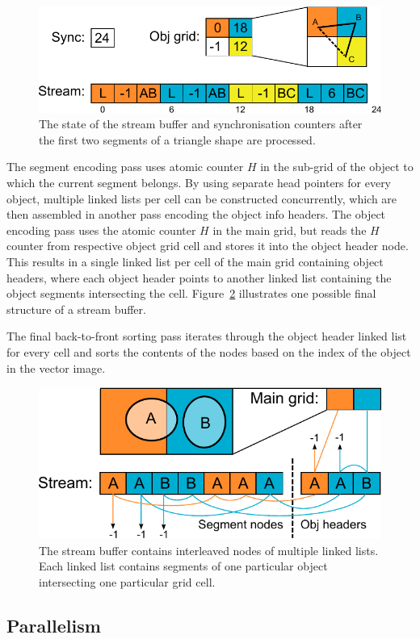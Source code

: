 \documentclass[11pt,a4paper,twoside]{article}
\begin{document}
\begin {figure}
	\centering
	\includegraphics[width=0.6\columnwidth] {figures/cell_stream}
	\caption {The state of the stream buffer and synchronisation counters after the first two segments of a triangle shape are processed.}
	\label {fig:cell_stream}
\end {figure}

The segment encoding pass uses atomic counter $H$ in the sub-grid of the object to which the current segment belongs. By using separate head pointers for every object, multiple linked lists per cell can be constructed concurrently, which are then assembled in another pass encoding the object info headers. The object encoding pass uses the atomic counter $H$ in the main grid, but reads the $H$ counter from respective object grid cell and stores it into the object header node. This results in a single linked list per cell of the main grid containing object headers, where each object header points to another linked list containing the object segments intersecting the cell. Figure~\ref{fig:obj_stream} illustrates one possible final structure of a stream buffer.

The final back-to-front sorting pass iterates through the object header linked list for every cell and sorts the contents of the nodes based on the index of the object in the vector image.

\begin {figure}
	\centering
	\includegraphics[width=0.6\columnwidth] {figures/obj_stream}
	\caption {The stream buffer contains interleaved nodes of multiple linked lists. Each linked list contains segments of one particular object intersecting one particular grid cell.}
	\label {fig:obj_stream}
\end {figure}

\subsection {Parallelism}
\end{document}
